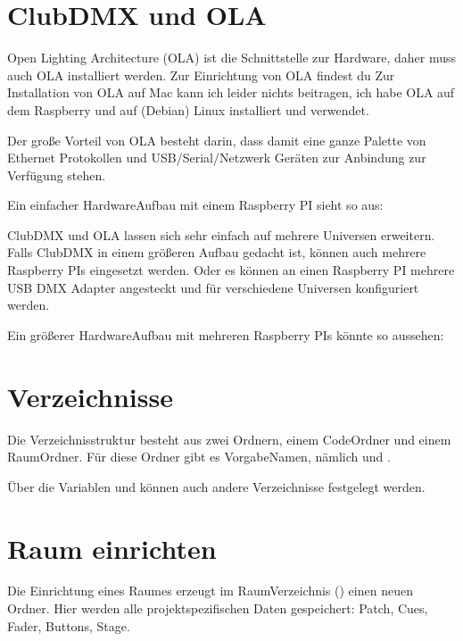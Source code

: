 \documentclass[letterpaper,10pt,ngerman]{sphinxmanual}
\begin{document}
\section{ClubDMX und OLA}
\label{\detokenize{einrichten:clubdmx-und-ola}}
Open Lighting Architecture (OLA) ist die Schnittstelle zur Hardware,
daher muss auch OLA installiert werden. Zur Einrichtung von OLA
findest du
Zur Installation von OLA auf Mac kann ich leider
nichts beitragen, ich habe OLA auf dem Raspberry und auf (Debian) Linux
installiert und verwendet.

Der große Vorteil von OLA besteht darin, dass damit eine ganze Palette
von Ethernet Protokollen und USB/Serial/Netzwerk Geräten zur
Anbindung zur Verfügung stehen.

Ein einfacher Hardware\sphinxhyphen{}Aufbau mit einem Raspberry PI sieht so aus:

\noindent{}

ClubDMX und OLA lassen sich sehr einfach auf mehrere Universen erweitern.
Falls ClubDMX in einem größeren Aufbau gedacht ist, können auch mehrere
Raspberry PIs eingesetzt werden. Oder es können an einen Raspberry PI
mehrere USB DMX Adapter angesteckt und für verschiedene Universen
konfiguriert werden.

Ein größerer Hardware\sphinxhyphen{}Aufbau mit mehreren Raspberry PIs könnte so aussehen:

\noindent{}


\section{Verzeichnisse}
\label{\detokenize{einrichten:verzeichnisse}}
Die Verzeichnisstruktur besteht aus zwei Ordnern, einem Code\sphinxhyphen{}Ordner und
einem Raum\sphinxhyphen{}Ordner. Für diese Ordner gibt es Vorgabe\sphinxhyphen{}Namen, nämlich
 und  .

Über die \sphinxhyphen{}Variablen  und 
können auch andere Verzeichnisse festgelegt werden.


\section{Raum einrichten}
\label{\detokenize{einrichten:raum-einrichten}}\label{\detokenize{einrichten:roomsetup}}
Die Einrichtung eines Raumes erzeugt im Raum\sphinxhyphen{}Verzeichnis ()
einen neuen Ordner. Hier werden alle projektspezifischen Daten gespeichert:
Patch, Cues, Fader, Buttons, Stage.
\end{document}
